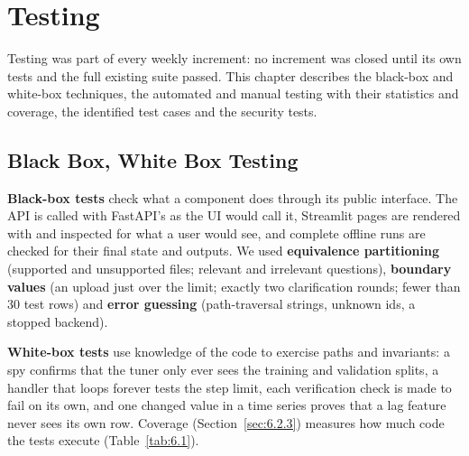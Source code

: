 \chapter{Testing}\label{ch:6}

Testing was part of every weekly increment: no increment was closed until its own tests and the full existing suite passed. This chapter describes the black-box and white-box techniques, the automated and manual testing with their statistics and coverage, the identified test cases and the security tests.

\FloatBarrier
\section{Black Box, White Box Testing}\label{sec:6.1}

\textbf{Black-box tests} check what a component does through its public interface. The API is called with FastAPI's  as the UI would call it, Streamlit pages are rendered with  and inspected for what a user would see, and complete offline runs are checked for their final state and outputs. We used \textbf{equivalence partitioning} (supported and unsupported files; relevant and irrelevant questions), \textbf{boundary values} (an upload just over the limit; exactly two clarification rounds; fewer than 30 test rows) and \textbf{error guessing} (path-traversal strings, unknown ids, a stopped backend).

\textbf{White-box tests} use knowledge of the code to exercise paths and invariants: a spy confirms that the tuner only ever sees the training and validation splits, a handler that loops forever tests the step limit, each verification check is made to fail on its own, and one changed value in a time series proves that a lag feature never sees its own row. Coverage (Section~\ref{sec:6.2.3}) measures how much code the tests execute (Table~\ref{tab:6.1}).

